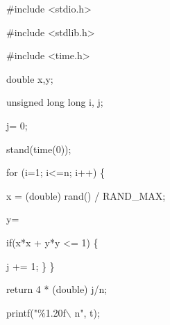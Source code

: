 \documentclass[a4paper, 12pt]{article}
\begin{document}
\#include <stdio.h> 

\#include <stdlib.h> 

\#include <time.h>
\newline

double x,y;
\newline

unsigned long long i, j;
\newline

j= 0;
\newline

stand(time(0));
\newline

for (i=1; i<=n; i++) \{

x = (double) rand() / RAND\_MAX;

y=
\newline

if(x*x + y*y <= 1) \{

j += 1;
\}
\newline
\}
\newline

return 4 * (double) j/n;
\newline

printf("\%1.20f$\backslash$ n", t);
\end{document}
